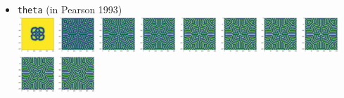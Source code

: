 \begin{itemize}
\item {\tt theta} (in Pearson 1993)\\
\includegraphics[width=1.4cm]{python_codes/fieldstone_171/pearson93/theta_solution_0001000_u}
\includegraphics[width=1.4cm]{python_codes/fieldstone_171/pearson93/theta_solution_0005000_u}
\includegraphics[width=1.4cm]{python_codes/fieldstone_171/pearson93/theta_solution_0010000_u}
\includegraphics[width=1.4cm]{python_codes/fieldstone_171/pearson93/theta_solution_0015000_u}
\includegraphics[width=1.4cm]{python_codes/fieldstone_171/pearson93/theta_solution_0020000_u}
\includegraphics[width=1.4cm]{python_codes/fieldstone_171/pearson93/theta_solution_0030000_u}
\includegraphics[width=1.4cm]{python_codes/fieldstone_171/pearson93/theta_solution_0040000_u}
\includegraphics[width=1.4cm]{python_codes/fieldstone_171/pearson93/theta_solution_0050000_u}
\includegraphics[width=1.4cm]{python_codes/fieldstone_171/pearson93/theta_solution_0075000_u}
\includegraphics[width=1.4cm]{python_codes/fieldstone_171/pearson93/theta_solution_final_u}


\end{itemize}
